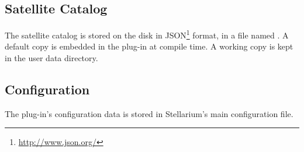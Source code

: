 \subsection{Satellite Catalog}
\label{sec:plugins:Satellites:catalog}



The satellite catalog is stored on the disk in JSON\footnote{\url{http://www.json.org/}}
format, in a file named . A default copy is embedded in the
plug-in at compile time. A working copy is kept in the user data directory.

\subsection{Configuration}
\label{sec:plugins:Satellites:configuration}


The plug-in's configuration data is stored in Stellarium's main configuration
file.





